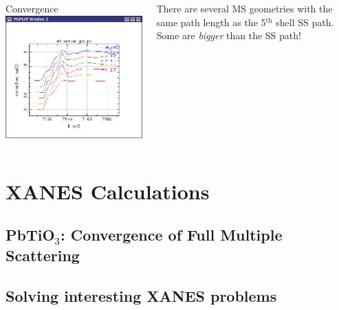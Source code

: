 \documentclass[10pt, xcolor=x11names, compress]{beamer}
\newcommand{\pto}{PbTiO$_3$}
\begin{document}
\begin{frame}
  \medskip
  
  \begin{columns}
    \begin{column}{0.4\linewidth}
      \begin{block}{Convergence}
        \includegraphics[width=\linewidth]{images/xanes_convergence}
      \end{block}
    \end{column}
    \begin{column}{0.6\linewidth}
      There are several MS geometries with the same path length as the
      5$^{\mathrm{th}}$ shell SS path.  Some are \emph{bigger} than
      the SS path!
    \end{column}
  \end{columns}
\end{frame}


\section[XANES]{XANES Calculations}
\subsection[Convergence of XANES]{\pto: Convergence of Full Multiple Scattering}


\subsection[Interesting XANES Problems]{Solving interesting XANES problems}

\end{document}
